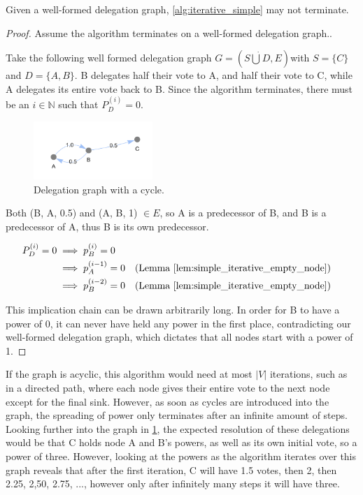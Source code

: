 \begin{theorem}\label{alg:iterative_alg_doesnt_terminate}
Given a well-formed delegation graph, \cref{alg:iterative_simple} may not terminate.
\end{theorem}
\begin{proof} Assume the algorithm terminates on a well-formed delegation graph..

Take the following well formed delegation graph $G = (S \dot\bigcup D, E)$with $S =\{C\}$ and $D = \{A, B\}$. B delegates half their vote to A, and half their vote to C, while A delegates its entire vote back to B. Since the algorithm terminates, there must be an $i \in \mathbb{N}$ such that $P_D^{(i)} = 0$. 

\begin{figure}[h]
    \centering
    \includegraphics[width=0.4\textwidth]{small_cycle_graph}
    \caption{Delegation graph with a cycle.}
    \label{fig:small_cycle_graph}
\end{figure}


Both (B, A, 0.5) and (A, B, 1) $\in E$, so A is a predecessor of B, and B is a predecessor of A, thus B is its own predecessor.

\begin{align*}
	P_D^{(i)} = 0 
	&\implies p_B^{(i)} = 0 \\
	&\implies p_A^{(i-1)} = 0 &&\text{(Lemma \cref{lem:simple_iterative_empty_node})} \\
	&\implies p_B^{(i-2)} = 0 &&\text{(Lemma \cref{lem:simple_iterative_empty_node})}
\end{align*}

This implication chain can be drawn arbitrarily long. In order for B to have a power of 0, it can never have held any power in the first place, contradicting our well-formed delegation graph, which dictates that all nodes start with a power of 1.
\end{proof}

If the graph is acyclic, this algorithm would need at most $|V|$ iterations, such as in a directed path, where each node gives their entire vote to the next node except for the final sink. However, as soon as cycles are introduced into the graph, the spreading of power only terminates after an infinite amount of steps. Looking further into the graph in \cref{fig:small_cycle_graph}, the expected resolution of these delegations would be that C holds node A and B's powers, as well as its own initial vote, so a power of three. However, looking at the powers as the algorithm iterates over this graph reveals that after the first iteration, C will have 1.5 votes, then 2, then 2.25, 2,50, 2.75, ..., however only after infinitely many steps it will have three. 

